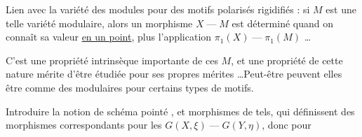 Lien avec la variété des modules pour des
motifs polarisés rigidifiés : si  $M$ est
une telle variété modulaire, alors
un morphisme $X\mathrel{\text{---}}M$ est déterminé
quand on connaît sa valeur \uline{en un point},
plus l'application $\pi_1(X)\mathrel{\text{---}}\pi_1(M)$ \ldots

C'est une propriété intrinsèque importante de
ces $M$, et une propriété de cette
nature mérite d'être étudiée pour ses
propres mérites \ldots Peut-être peuvent elles
 être  comme des 
modulaires pour certains types de
motifs.


Introduire la notion de schéma  pointé
, et
morphismes de tels, qui définissent des
morphismes correspondants pour les
$G(X,\xi)\mathrel{\text{---}}G(Y,\eta)$, donc pour
